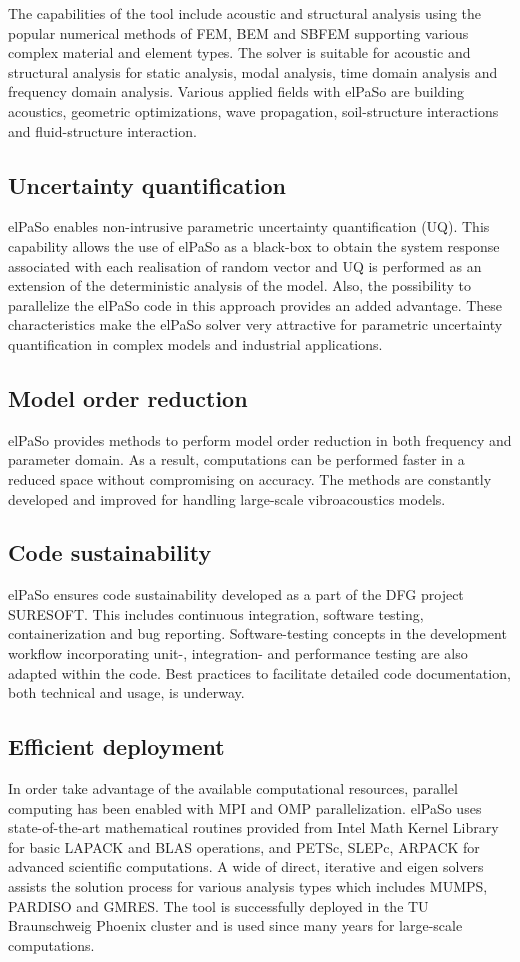 The capabilities of the tool include acoustic and structural analysis using the popular numerical methods of FEM, BEM and SBFEM supporting various complex material and element types. The solver is suitable for acoustic and structural analysis for static analysis, modal analysis, time domain analysis and frequency domain analysis. Various applied fields with elPaSo are building acoustics, geometric optimizations, wave propagation, soil-structure interactions and fluid-structure interaction.

\subsection{Uncertainty quantification}
elPaSo enables non-intrusive parametric uncertainty quantification (UQ). This capability allows the use of elPaSo as a black-box to obtain the system response associated with each realisation of random vector and UQ is performed as an extension of the deterministic analysis of the model. Also, the possibility to parallelize the elPaSo code in this approach provides an added advantage. These characteristics make the elPaSo solver very attractive for parametric uncertainty quantification in complex models and industrial applications.

\subsection{Model order reduction}
elPaSo provides methods to perform model order reduction in both frequency and parameter domain. As a result, computations can be performed faster in a reduced space without compromising on accuracy. The methods are constantly developed and improved for handling large-scale vibroacoustics models.

\subsection{Code sustainability}
elPaSo ensures code sustainability developed as a part of the DFG project SURESOFT. This includes continuous integration, software testing, containerization and bug reporting. Software-testing concepts in the development workflow incorporating unit-, integration- and performance testing are also adapted within the code. Best practices to facilitate detailed code documentation, both technical and usage, is underway.

\subsection{Efficient deployment}
In order take advantage of the available computational resources, parallel computing has been enabled with MPI and OMP parallelization. elPaSo uses state-of-the-art mathematical routines provided from Intel Math Kernel Library for basic LAPACK and BLAS operations, and PETSc, SLEPc, ARPACK for advanced scientific computations. A wide of direct, iterative and eigen solvers assists the solution process for various analysis types which includes MUMPS, PARDISO and GMRES. The tool is successfully deployed in the TU Braunschweig Phoenix cluster and is used since many years for large-scale computations.

